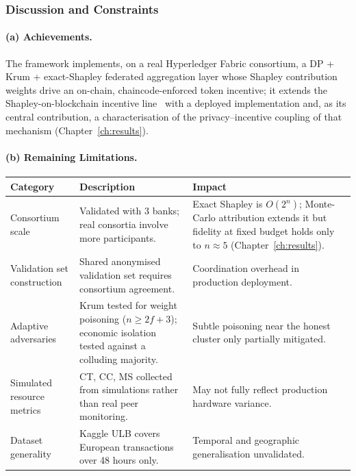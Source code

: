 \subsubsection*{Discussion and Constraints}

\paragraph{(a) Achievements.}
The framework implements, on a real Hyperledger Fabric consortium, a DP + Krum + exact-Shapley federated aggregation layer whose Shapley contribution weights drive an on-chain, chaincode-enforced token incentive; it extends the Shapley-on-blockchain incentive line~\cite{fedcoin2020,zhao2026sichainfl} with a deployed implementation and, as its central contribution, a characterisation of the privacy--incentive coupling of that mechanism (Chapter~\ref{ch:results}).

\paragraph{(b) Remaining Limitations.}

\begin{center}
\label{tab:fl_adtcn_limits}
\begin{tabular}{|p{2.6cm}|p{5.9cm}|p{5.0cm}|}
\hline
\textbf{Category} & \textbf{Description} & \textbf{Impact} \\ \hline
Consortium scale & Validated with 3 banks; real consortia involve more participants. & Exact Shapley is $O(2^n)$; Monte-Carlo attribution extends it but fidelity at fixed budget holds only to $n\approx 5$ (Chapter~\ref{ch:results}). \\ \hline
Validation set construction & Shared anonymised validation set requires consortium agreement. & Coordination overhead in production deployment. \\ \hline
Adaptive adversaries & Krum tested for weight poisoning ($n\ge 2f+3$); economic isolation tested against a colluding majority. & Subtle poisoning near the honest cluster only partially mitigated. \\ \hline
Simulated resource metrics & CT, CC, MS collected from simulations rather than real peer monitoring. & May not fully reflect production hardware variance. \\ \hline
Dataset generality & Kaggle ULB covers European transactions over 48 hours only. & Temporal and geographic generalisation unvalidated. \\ \hline
\end{tabular}
\end{center}

